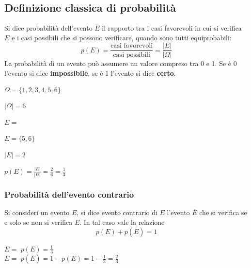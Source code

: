 \documentclass{article}     %
\begin{document}
        \subsection{Definizione classica di probabilità}
        \begin{boxdef}
            Si dice probabilità dell'evento $E$ il rapporto tra i casi favorevoli in cui si verifica $E$ e i casi possibili che si possono verificare, quando sono tutti equiprobabili:
        \[p(E)=\frac{\text{casi favorevoli}}{\text{casi possibili}}=\frac{|E|}{|\Omega|}\]
        La probabilità di un evento può assumere un valore compreso tra 0 e 1. Se è 0 l'evento si dice \textbf{impossibile}, se è 1 l'evento si dice \textbf{certo}. 
        \end{boxdef}
        \begin{ex}


        $\Omega=\{1,2,3,4,5,6\}$

        $|\Omega|=6$

        $E=$

        $E=\{5,6\}$

        $|E|=2$

        $p(E)=\frac{|E|}{|\Omega|}=\frac{2}{6}=\frac{1}{3}$
    \end{ex} 

        \subsubsection{Probabilità dell'evento contrario}
            Si consideri un evento $E$, si dice evento contrario di $E$ l'evento $\overline{E}$ che si verifica se e solo se non si verifica $E$.
            In tal caso vale la relazione \[p(E)+p(\overline{E})=1\]
            \begin{ex}
                $E=$ \qquad $p(E)=\frac{1}{3}$ \\
                $\overline{E}=$ \qquad $p(\overline{E})=1-p(E)=1-\frac{1}{3}=\frac{2}{3}$
            \end{ex}
            
\end{document}
